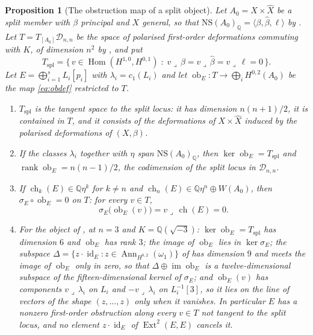 \documentclass[11pt,reqno]{amsart}
\theoremstyle{plain}
\newtheorem{proposition}[theorem]{Proposition}
\theoremstyle{definition}
\theoremstyle{remark}
\newcommand{\QQ}{\mathbb{Q}}
\newcommand{\cD}{\mathcal{D}}
\newcommand{\HW}{W}                      %
\newcommand{\NS}{\mathrm{NS}}
\DeclareMathOperator{\ch}{ch}
\DeclareMathOperator{\Hom}{Hom}
\DeclareMathOperator{\Ext}{Ext}
\DeclareMathOperator{\image}{im}
\DeclareMathOperator{\id}{id}
\DeclareMathOperator{\ob}{ob}
\DeclareMathOperator{\Ann}{Ann}
\begin{document}
\begin{proposition}[The obstruction map of a split object]
\label{prop:splitobstruction}
Let $A_{0}=X\times\widehat X$ be a split member with $\beta$ principal and
$X$ general, so that $\NS(A_{0})_{\QQ}=\langle\beta,\widehat\beta,\ell\rangle$
by \cite[Proposition~15.19(iv)]{paperI}. Let $T=T_{[A_{0}]}\cD_{n,n}$ be the space of
polarised first-order deformations commuting with $K$, of dimension $n^{2}$
by \cite[Proposition~9.14]{paperI}, and put
\[
  T_{\mathrm{spl}}
  =\bigl\{\,v\in\Hom(H^{1,0},H^{0,1})\;:\;
    v\lrcorner\,\beta=v\lrcorner\,\widehat\beta=v\lrcorner\,\ell=0\,\bigr\}.
\]
Let $E=\bigoplus_{i=1}^{s}L_{i}[p_{i}]$ with $\lambda_{i}=c_{1}(L_{i})$ and
let $\ob_{E}\colon T\to\bigoplus_{i}H^{0,2}(A_{0})$ be the map
\eqref{eq:obdef} restricted to $T$.
\begin{enumerate}[label=\textup{(\roman*)},nosep]
\item $T_{\mathrm{spl}}$ is the tangent space to the split locus: it has
  dimension $n(n+1)/2$, it is contained in $T$, and it consists of the
  deformations of $X\times\widehat X$ induced by the polarised deformations
  of $(X,\beta)$.
\item If the classes $\lambda_{i}$ together with $\eta$ span
  $\NS(A_{0})_{\QQ}$, then $\ker\ob_{E}=T_{\mathrm{spl}}$ and
  $\operatorname{rank}\ob_{E}=n(n-1)/2$, the codimension of the split locus
  in $\cD_{n,n}$.
\item If $\ch_{k}(E)\in\QQ\eta^{k}$ for $k\ne n$ and
  $\ch_{n}(E)\in\QQ\eta^{n}\oplus\HW(A_{0})$, then
  $\sigma_{E}\circ\ob_{E}=0$ on $T$: for every $v\in T$,
  \begin{equation}\label{eq:sigmaob}
    \sigma_{E}\bigl(\ob_{E}(v)\bigr)=v\lrcorner\,\ch(E)=0 .
  \end{equation}
\item For the object of , at $n=3$ and
  $K=\QQ(\sqrt{-3})$: $\ker\ob_{E}=T_{\mathrm{spl}}$ has dimension $6$ and
  $\ob_{E}$ has rank $3$; the image of $\ob_{E}$ lies in $\ker\sigma_{E}$;
  the subspace $\Delta=\{z\cdot\id_{E}:z\in\Ann_{H^{0,2}}(\omega_{1})\}$ of
  \cite[Corollary~9.18]{paperI} has dimension $9$ and meets the image of $\ob_{E}$
  only in zero, so that $\Delta\oplus\image\ob_{E}$ is a twelve-dimensional
  subspace of the fifteen-dimensional kernel of $\sigma_{E}$; and
  $\ob_{E}(v)$ has components $v\lrcorner\,\lambda_{i}$ on $L_{i}$ and
  $-v\lrcorner\,\lambda_{i}$ on $L_{i}^{-1}[3]$, so it lies on the line of
  vectors of the shape $(z,\dots,z)$ only when it vanishes. In particular
  $E$ has a nonzero first-order obstruction along every $v\in T$ not tangent
  to the split locus, and no element $z\cdot\id_{E}$ of $\Ext^{2}(E,E)$
  cancels it.
\end{enumerate}
\end{proposition}
\end{document}
